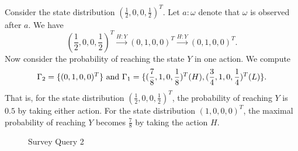 Consider the state distribution $(\frac{1}{2}, 0, 0, \frac{1}{2})^T$.
Let $a:\omega$ denote that $\omega$ is observed after $a$. We have
\[
  (\frac{1}{2}, 0, 0, \frac{1}{2})^T
  \overset{H:Y}{\longrightarrow}
  (0, 1, 0, 0)^T
  \overset{H:Y}{\longrightarrow}
  (0, 1, 0, 0)^T.
\]
Now consider the probability of reaching the state $Y$ in one
action. We compute
\[
  \Gamma_2 = \{ (0, 1, 0, 0)^T \}
  \textmd{ and }
  \Gamma_1 = \{ (\frac{7}{8}, 1, 0, \frac{1}{8})^T (H),
                (\frac{3}{4}, 1, 0, \frac{1}{4})^T (L) \}.
\]
That is, for the state distribution $(\frac{1}{2}, 0, 0,
\frac{1}{2})^T$, the probability of reaching $Y$ is $0.5$ by
taking either action. For
the state distribution $(1, 0, 0, 0)^T$, the maximal probability of
reaching $Y$ becomes $\frac{7}{8}$ by taking the action $H$.

\begin{figure}
  \centering
  \caption{Survey Query 2}
  \label{figure:survey-2}
\end{figure}

